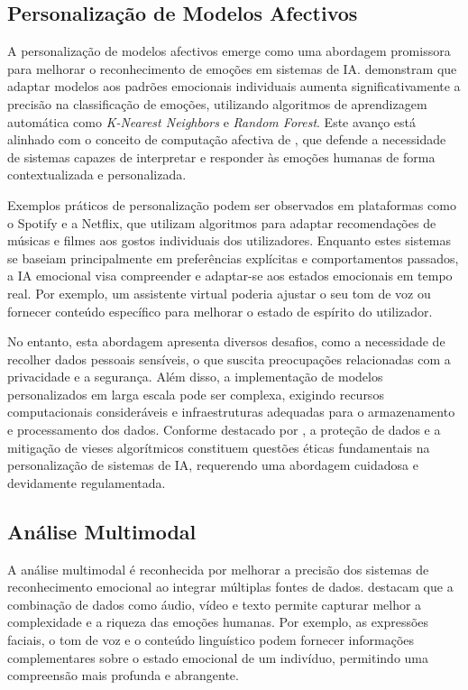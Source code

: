 \documentclass[a4paper,12pt]{report}
\begin{document}
	\subsection{Personalização de Modelos Afectivos}
	
	A personalização de modelos afectivos emerge como uma abordagem promissora para melhorar o reconhecimento de emoções em sistemas de IA. \textcite{kargarandehkordi2024} demonstram que adaptar modelos aos padrões emocionais individuais aumenta significativamente a precisão na classificação de emoções, utilizando algoritmos de aprendizagem automática como \textit{K-Nearest Neighbors} e \textit{Random Forest}. Este avanço está alinhado com o conceito de computação afectiva de \textcite{picard1997}, que defende a necessidade de sistemas capazes de interpretar e responder às emoções humanas de forma contextualizada e personalizada.
	
	Exemplos práticos de personalização podem ser observados em plataformas como o Spotify e a Netflix, que utilizam algoritmos para adaptar recomendações de músicas e filmes aos gostos individuais dos utilizadores. Enquanto estes sistemas se baseiam principalmente em preferências explícitas e comportamentos passados, a IA emocional visa compreender e adaptar-se aos estados emocionais em tempo real. Por exemplo, um assistente virtual poderia ajustar o seu tom de voz ou fornecer conteúdo específico para melhorar o estado de espírito do utilizador.
	
	No entanto, esta abordagem apresenta diversos desafios, como a necessidade de recolher dados pessoais sensíveis, o que suscita preocupações relacionadas com a privacidade e a segurança. Além disso, a implementação de modelos personalizados em larga escala pode ser complexa, exigindo recursos computacionais consideráveis e infraestruturas adequadas para o armazenamento e processamento dos dados. Conforme destacado por \textcite{mueller2020}, a proteção de dados e a mitigação de vieses algorítmicos constituem questões éticas fundamentais na personalização de sistemas de IA, requerendo uma abordagem cuidadosa e devidamente regulamentada.
	
	\subsection{Análise Multimodal}
	
	A análise multimodal é reconhecida por melhorar a precisão dos sistemas de reconhecimento emocional ao integrar múltiplas fontes de dados. \textcite{kaur2019} destacam que a combinação de dados como áudio, vídeo e texto permite capturar melhor a complexidade e a riqueza das emoções humanas. Por exemplo, as expressões faciais, o tom de voz e o conteúdo linguístico podem fornecer informações complementares sobre o estado emocional de um indivíduo, permitindo uma compreensão mais profunda e abrangente.
	
\end{document}
